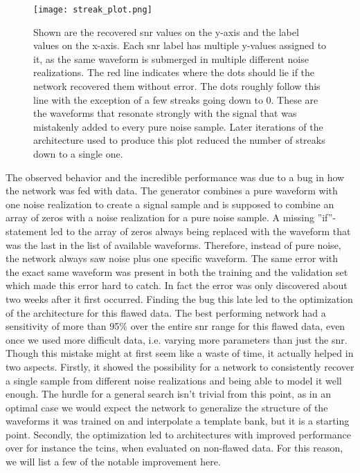 \begin{figure}
\centering
\texttt{[image: streak\_plot.png]}
\caption[Plot of recovered values showcasing an error]{Shown are the recovered \gls{snr} values on the y-axis and the label values on the x-axis. Each \gls{snr} label has multiple y-values assigned to it, as the same waveform is submerged in multiple different noise realizations. The red line indicates where the dots should lie if the network recovered them without error. The dots roughly follow this line with the exception of a few streaks going down to 0. These are the waveforms that resonate strongly with the signal that was mistakenly added to every pure noise sample. Later iterations of the architecture used to produce this plot reduced the number of streaks down to a single one.}\label{fig:streak_plot}
\end{figure}
The observed behavior and the incredible performance was due to a bug in how the network was fed with data. The generator combines a pure waveform with one noise realization to create a signal sample and is supposed to combine an array of zeros with a noise realization for a pure noise sample. A missing ''if''-statement led to the array of zeros always being replaced with the waveform that was the last in the list of available waveforms. Therefore, instead of pure noise, the network always saw noise plus one specific waveform. The same error with the exact same waveform was present in both the training and the validation set which made this error hard to catch. In fact the error was only discovered about two weeks after it first occurred. Finding the bug this late led to the optimization of the architecture for this flawed data. The best performing network had a sensitivity of more than 95\% over the entire \gls{snr} range for this flawed data, even once we used more difficult data, i.e. varying more parameters than just the \gls{snr}.\\
Though this mistake might at first seem like a waste of time, it actually helped in two aspects. Firstly, it showed the possibility for a network to consistently recover a single sample from different noise realizations and being able to model it well enough. The hurdle for a general search isn't trivial from this point, as in an optimal case we would expect the network to generalize the structure of the waveforms it was trained on and interpolate a template bank, but it is a starting point. Secondly, the optimization led to architectures with improved performance over for instance the \gls{tcin}s, when evaluated on non-flawed data. For this reason, we will list a few of the notable improvement here.\smallskip\\

